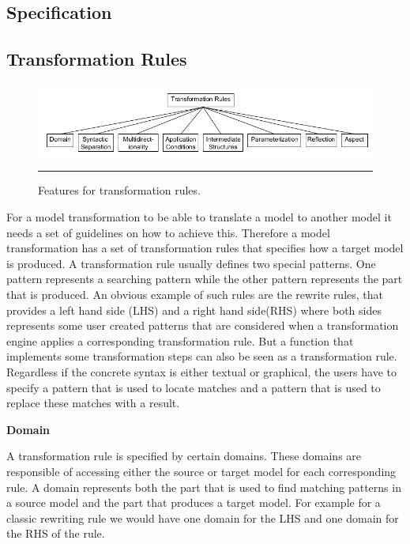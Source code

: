 \subsection{Specification}

\subsection{Transformation Rules}

\begin{figure}[H]
  \centering
    \includegraphics[scale=0.7]{./Figures/TransformationRules.png}
    \rule{35em}{0.5pt}
  \caption[Feature diagram for transformation rules]
  {Features for transformation rules.}
  \label{fig:TransformationRules}
\end{figure}

For a model transformation to be able to translate a model to another model it
needs a set of guidelines on how to achieve this. Therefore a model
transformation has a set of transformation rules that specifies how a target
model is produced. A transformation rule usually defines two special patterns.
One pattern represents a searching pattern while the other pattern represents
the part that is produced.  An obvious example of such rules are the rewrite
rules, that provides a left hand side (LHS) and a right hand side(RHS) where
both sides represents some user created patterns that are considered when a
transformation engine applies a corresponding transformation rule. But a
function that implements some transformation steps can also be seen as a
transformation rule. Regardless if the concrete syntax is either textual or
graphical, the users have to specify a pattern that is used to locate matches
and a pattern that is used to replace these matches with a result.

\textbf{Domain}

A transformation rule is specified by certain domains. These domains are
responsible of accessing either the source or target model for each
corresponding rule. A domain represents both the part that is used to find
matching patterns in a source model and the part that produces a target model.
For example for a classic rewriting rule we would have one domain for the LHS
and one domain for the RHS of the rule. 

